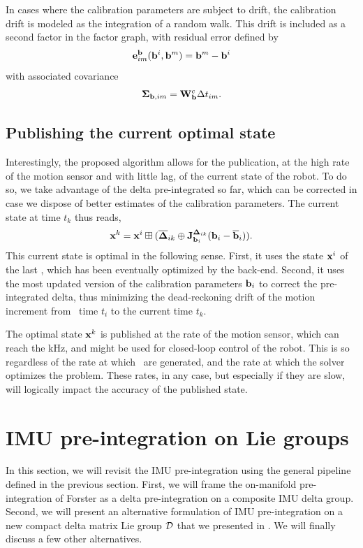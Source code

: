 In cases where the calibration parameters are subject to drift, the calibration drift is modeled as the integration of a random walk. This drift is included as a second factor 
in the factor graph, with residual error defined by
%
\begin{equation}
    {\bf e}^{{\bf b}}_{im}({\bf b}^i, {\bf b}^m) = {\bf b}^m - {\bf b}^i
\end{equation}
%
with associated covariance
%
\begin{equation}
    {\bm \Sigma}_{{\bf b},im} = {\bf W}^c_{{\bf b}} \Delta t_{im}.
\end{equation}



\subsection{Publishing the current optimal state}
\label{sec:publish-state}

Interestingly, the proposed algorithm allows for the publication, at the high rate of the motion sensor and with little lag, of the current state of the robot. 
To do so, we take advantage of the delta pre-integrated so far, which can be corrected in case we dispose of better estimates of the calibration parameters. 
The current state at time $t_k$ thus reads,
%
\begin{align}
    {\bf x}^k = {\bf x}^i \boxplus (\overline{{{\bm \Delta}}}_{ik} \oplus {\bf J}^{{{\bm \Delta}}_{ik}}_{{\bf b}_i} ({\bf b}_i - \overline{{\bf b}}_i)).
\end{align}
%
This current state is optimal in the following sense. First, it uses the state ${\bf x}^i$ of the last \keyframe, which has been eventually optimized by the back-end. 
Second, it uses the most updated version of the calibration parameters ${\bf b}_i$ to correct the pre-integrated delta, thus minimizing the dead-reckoning drift of the motion 
increment from \keyframe\ time $t_i$ to the current time $t_k$.

The optimal state ${\bf x}^k$ is published at the rate of the motion sensor, which can reach the kHz, and might be used for closed-loop control of the robot. 
This is so regardless of the rate at which \keyframes\ are generated, and the rate at which the solver optimizes the problem. These rates, in any case, but especially 
if they are slow, will logically impact the accuracy of the published state.

%
%
%
%
\section{IMU pre-integration on Lie groups}
In this section, we will revisit the IMU pre-integration using the general pipeline defined in the previous section. First, we will frame the on-manifold pre-integration
of Forster \cite{forster2015imu, forster2017-TRO} as a delta pre-integration on a composite IMU delta group.
Second, we will present an alternative formulation of IMU pre-integration on a new compact delta matrix Lie group $\mathcal{D}$ that we presented in \cite{fourmy2019absolute}.
We will finally discuss a few other alternatives.


